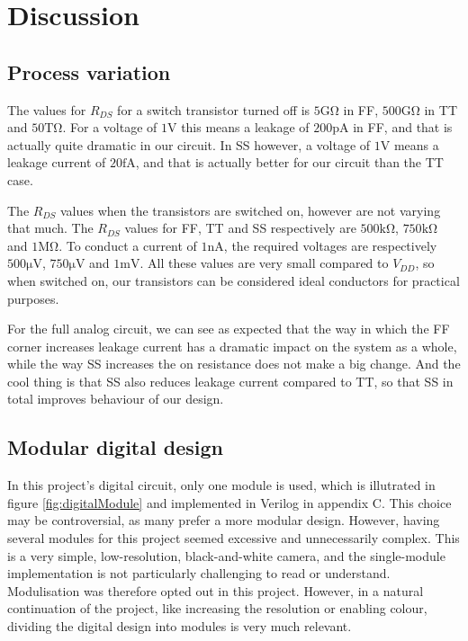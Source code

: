 \section{Discussion}
\subsection{Process variation}

The values for $R_{DS}$ for a switch transistor turned off is $5 \mathrm{G\Omega}$ in FF, $500 \mathrm{G\Omega}$ in TT and $50 \mathrm{T\Omega}$. For a voltage of $1\mathrm{V}$ this means a leakage of $200\mathrm{pA}$ in FF, and that is actually quite dramatic in our circuit. In SS however, a voltage of $1\mathrm{V}$ means a leakage current of $20\mathrm{fA}$, and that is actually better for our circuit than the TT case.

The $R_{DS}$ values when the transistors are switched on, however are not varying that much. The $R_{DS}$ values for FF, TT and SS respectively are $500 \mathrm{k\Omega}$, $750 \mathrm{k\Omega}$ and $1 \mathrm{M\Omega}$. To conduct a current of $1\mathrm{nA}$, the required voltages are respectively $500 \mathrm{\mu V}$, $750 \mathrm{\mu V}$ and $1 \mathrm{mV}$. All these values are very small compared to $V_{DD}$, so when switched on, our transistors can be considered ideal conductors for practical purposes.

For the full analog circuit, we can see as expected that the way in which the FF corner increases leakage current has a dramatic impact on the system as a whole, while the way SS increases the on resistance does not make a big change. And the cool thing is that SS also reduces leakage current compared to TT, so that SS in total improves behaviour of our design.

\subsection{Modular digital design}

In this project's digital circuit, only one module is used, which is illutrated in figure \ref{fig:digitalModule} and implemented in Verilog in appendix C. This choice may be controversial, as many prefer a more modular design. However, having several modules for this project seemed excessive and unnecessarily complex. This is a very simple, low-resolution, black-and-white camera, and the single-module implementation is not particularly challenging to read or understand. Modulisation was therefore opted out in this project. However, in a natural continuation of the project, like increasing the resolution or enabling colour, dividing the digital design into modules is very much relevant.
